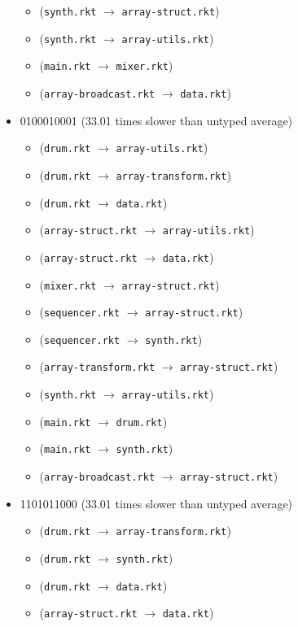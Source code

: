 \documentclass{article}
\newcommand{\mono}[1]{\texttt{#1}}
\begin{document}
\begin{itemize}
\begin{itemize}
  \item (\mono{synth.rkt} $\rightarrow$ \mono{array-struct.rkt})
  \item (\mono{synth.rkt} $\rightarrow$ \mono{array-utils.rkt})
  \item (\mono{main.rkt} $\rightarrow$ \mono{mixer.rkt})
  \item (\mono{array-broadcast.rkt} $\rightarrow$ \mono{data.rkt})
  \end{itemize}
\item 0100010001 (33.01 times slower than untyped average)
  \begin{itemize}
  \item (\mono{drum.rkt} $\rightarrow$ \mono{array-utils.rkt})
  \item (\mono{drum.rkt} $\rightarrow$ \mono{array-transform.rkt})
  \item (\mono{drum.rkt} $\rightarrow$ \mono{data.rkt})
  \item (\mono{array-struct.rkt} $\rightarrow$ \mono{array-utils.rkt})
  \item (\mono{array-struct.rkt} $\rightarrow$ \mono{data.rkt})
  \item (\mono{mixer.rkt} $\rightarrow$ \mono{array-struct.rkt})
  \item (\mono{sequencer.rkt} $\rightarrow$ \mono{array-struct.rkt})
  \item (\mono{sequencer.rkt} $\rightarrow$ \mono{synth.rkt})
  \item (\mono{array-transform.rkt} $\rightarrow$ \mono{array-struct.rkt})
  \item (\mono{synth.rkt} $\rightarrow$ \mono{array-utils.rkt})
  \item (\mono{main.rkt} $\rightarrow$ \mono{drum.rkt})
  \item (\mono{main.rkt} $\rightarrow$ \mono{synth.rkt})
  \item (\mono{array-broadcast.rkt} $\rightarrow$ \mono{array-struct.rkt})
  \end{itemize}
\item 1101011000 (33.01 times slower than untyped average)
  \begin{itemize}
  \item (\mono{drum.rkt} $\rightarrow$ \mono{array-transform.rkt})
  \item (\mono{drum.rkt} $\rightarrow$ \mono{synth.rkt})
  \item (\mono{drum.rkt} $\rightarrow$ \mono{data.rkt})
  \item (\mono{array-struct.rkt} $\rightarrow$ \mono{data.rkt})

\end{itemize}
\end{itemize}
\end{document}
